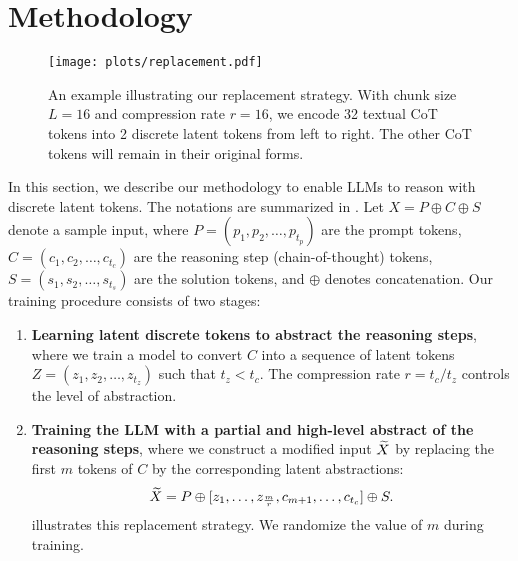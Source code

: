 \section{Methodology}
\label{sec:algo}
\begin{figure*}[t]
    \centering
    \texttt{[image: plots/replacement.pdf]}
    \caption{An example illustrating our replacement strategy. With chunk size $L=16$ and compression rate $r=16$, we encode 32 textual CoT tokens into 2 discrete latent tokens from left to right. The other CoT tokens will remain in their original forms. 
    }
    \label{fig:replacement}
\end{figure*}
In this section, we describe our methodology to enable LLMs to reason with discrete latent tokens. The notations are summarized in .
Let $X = P \oplus C \oplus S$ denote a sample input,
where $P = (p_1, p_2, \ldots, p_{t_p})$ are the prompt tokens, $C = (c_1, c_2, \ldots, c_{t_c})$ are the reasoning step (chain-of-thought) tokens,
$S = (s_1, s_2, \ldots, s_{t_s})$ are the solution tokens, and $\oplus$ denotes concatenation. Our training procedure consists of two stages:
\begin{enumerate}[leftmargin=*]\itemsep0em
    \item \textbf{Learning latent discrete tokens to abstract the reasoning steps}, where we train a model to convert $C$ into a sequence of latent tokens $Z = (z_1, z_2, \ldots, z_{t_z})$ such that $t_z < t_c$. The compression rate $r = t_c / t_z$ controls the level of abstraction.

    \item \textbf{Training the LLM with a partial and high-level abstract of the reasoning steps}, where we 
    construct a modified input ${\widetilde{X}}$ by
    replacing the first $m$ tokens of $C$ by the corresponding latent abstractions:
    \begin{equation}
        {\widetilde{X}} = P \oplus [z_1, \ldots, z_{\frac{m}{r}}, c_{m+1}, \ldots, c_{t_c}] \oplus S.
        \label{eq:X_replacement}
    \end{equation}
     illustrates this replacement strategy. We randomize the value of $m$ during training.
\end{enumerate}



